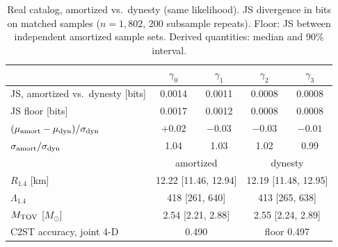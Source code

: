 \documentclass{article}
\newcommand{\Msun}{M_\odot}
\begin{document}
\begin{table}[t]
\caption{Real catalog, amortized vs.\ dynesty (same likelihood). JS divergence in bits on matched samples ($n{=}1{,}802$, 200 subsample repeats). Floor: JS between independent amortized sample sets. Derived quantities: median and 90\% interval.}
\label{tab:real}
\centering\small\setlength\tabcolsep{5pt}
\begin{tabular}{lcccc}
\toprule
 & $\gamma_0$ & $\gamma_1$ & $\gamma_2$ & $\gamma_3$ \\
\midrule
JS, amortized vs.\ dynesty [bits] & 0.0014 & 0.0011 & 0.0008 & 0.0008 \\
JS floor [bits] & 0.0017 & 0.0012 & 0.0008 & 0.0008 \\
$(\mu_{\rm amort}-\mu_{\rm dyn})/\sigma_{\rm dyn}$ & $+0.02$ & $-0.03$ & $-0.03$ & $-0.01$ \\
$\sigma_{\rm amort}/\sigma_{\rm dyn}$ & 1.04 & 1.03 & 1.02 & 0.99 \\
\midrule
 & \multicolumn{2}{c}{amortized} & \multicolumn{2}{c}{dynesty} \\
\midrule
$R_{1.4}$ [km] & \multicolumn{2}{c}{12.22 [11.46, 12.94]} & \multicolumn{2}{c}{12.19 [11.48, 12.95]} \\
$\Lambda_{1.4}$ & \multicolumn{2}{c}{418 [261, 640]} & \multicolumn{2}{c}{413 [265, 638]} \\
$M_{\rm TOV}$ [$\Msun$] & \multicolumn{2}{c}{2.54 [2.21, 2.88]} & \multicolumn{2}{c}{2.55 [2.24, 2.89]} \\
C2ST accuracy, joint 4-D & \multicolumn{2}{c}{0.490} & \multicolumn{2}{c}{floor 0.497} \\
\bottomrule
\end{tabular}
\end{table}
\end{document}
